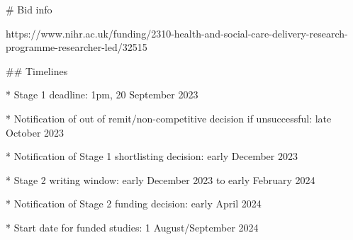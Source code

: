 \begin{markdown}
# Bid info

https://www.nihr.ac.uk/funding/2310-health-and-social-care-delivery-research-programme-researcher-led/32515

## Timelines

* Stage 1 deadline: 1pm, 20 September 2023

* Notification of out of remit/non-competitive decision if unsuccessful: late October 2023

* Notification of Stage 1 shortlisting decision: early December 2023

* Stage 2 writing window: early December 2023 to early February 2024

* Notification of Stage 2 funding decision: early April 2024

* Start date for funded studies: 1 August/September 2024
\end{markdown}